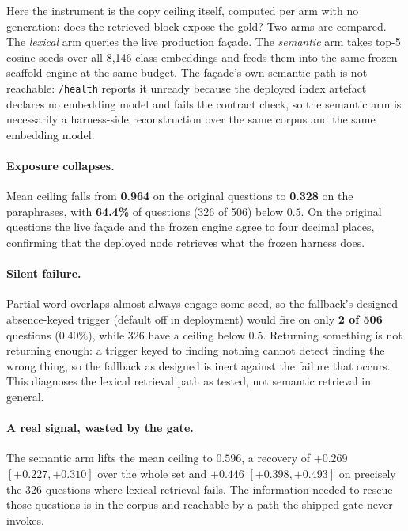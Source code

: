 \documentclass[10pt,twocolumn]{article}
\begin{document}
Here the instrument is the copy ceiling itself, computed per arm with no generation: does the retrieved
block expose the gold? Two arms are compared. The \emph{lexical} arm queries the live production
fa\c{c}ade. The \emph{semantic} arm takes top-5 cosine seeds over all 8{,}146 class embeddings and
feeds them into the same frozen scaffold engine at the same budget. The fa\c{c}ade's own semantic
path is not reachable: \texttt{/health} reports it unready because the deployed index artefact
declares no embedding model and fails the contract check, so the semantic arm is necessarily a
harness-side reconstruction over the same corpus and the same embedding model.

\paragraph{Exposure collapses.} Mean ceiling falls from \textbf{0.964} on the original questions to
\textbf{0.328} on the paraphrases, with \textbf{64.4\%} of questions (326 of 506) below $0.5$. On the
original questions the live fa\c{c}ade and the frozen engine agree to four decimal places, confirming
that the deployed node retrieves what the frozen harness does.

\paragraph{Silent failure.} Partial word overlaps almost always engage some seed, so the
fallback's designed absence-keyed trigger (default off in deployment) would fire on only \textbf{2 of 506} questions ($0.40\%$), while 326 have
a ceiling below $0.5$. Returning something is not returning enough: a trigger keyed to finding nothing cannot detect finding the wrong thing, so the
fallback as designed is inert against the failure that occurs. This diagnoses the lexical retrieval path as tested, not semantic retrieval in general.

\paragraph{A real signal, wasted by the gate.} The semantic arm lifts the mean ceiling to $0.596$,
a recovery of $+0.269$ $[+0.227,+0.310]$ over the whole set and $\mathbf{+0.446}$
$[+0.398,+0.493]$ on precisely the 326 questions where lexical retrieval fails. The information
needed to rescue those questions is in the corpus and reachable by a path the shipped gate never
invokes.
\end{document}
